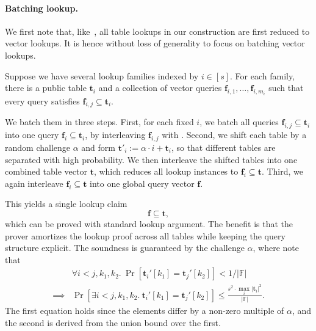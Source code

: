 \paragraph{Batching lookup.}
We first note that, like~\cite{cq++24}, all table lookups in our construction are
  first reduced to vector lookups.
  It is hence without loss of generality to focus on batching vector lookups.

Suppose we have several lookup families indexed by
$i\in[s]$. For each family, there is a public table $\mathbf{t}_i$ and a
collection of vector queries $\mathbf{f}_{i,1},\ldots,\mathbf{f}_{i,m_i}$ such
that every query satisfies $\mathbf{f}_{i,j}\subseteq \mathbf{t}_i$.

We batch them in three steps. First, for each fixed $i$, we batch all
queries $\mathbf{f}_{i, j}\subseteq \mathbf{t}_i$ 
into one query $\mathbf{f}_i\subseteq \mathbf{t}_i$,
by interleaving $\mathbf{f}_{i, j}$ with .
Second, we shift each table by a random challenge
$\alpha$ and form $\mathbf{t}'_i:=\alpha\cdot i+\mathbf{t}_i$, so that
different tables are separated with high probability.
We then interleave the
shifted tables into one combined table vector $\mathbf{t}$,
which reduces all lookup instances to $\mathbf{f}_i\subseteq \mathbf{t}$.
Third, we again
interleave $\mathbf{f}_i\subseteq \mathbf{t}$
into one global query vector $\mathbf{f}$.

This yields a single lookup claim
\[
\mathbf{f}\subseteq \mathbf{t},
\]
which can be proved with standard lookup argument.
The benefit is that the prover amortizes the lookup proof across all
tables while keeping the query structure explicit.
The soundness is guaranteed by the challenge $\alpha$,
where note that
\begin{align}
  &\forall i<j, k_1, k_2.\ \Pr[\mathbf{t}_i'[k_1] = \mathbf{t}_j'[k_2]] < 1/|\mathbb{F}|\\
  \implies& \Pr[\exists i<j, k_1, k_2.\ \mathbf{t}_i'[k_1] = \mathbf{t}_j'[k_2]] \leq \frac{s^2\cdot \max_i |\mathbf{t}_i|^2}{|\mathbb{F}|}.
\end{align}
The first equation holds since the elements differ
by a non-zero multiple of $\alpha$, 
and the second is derived from the union bound over the first.

